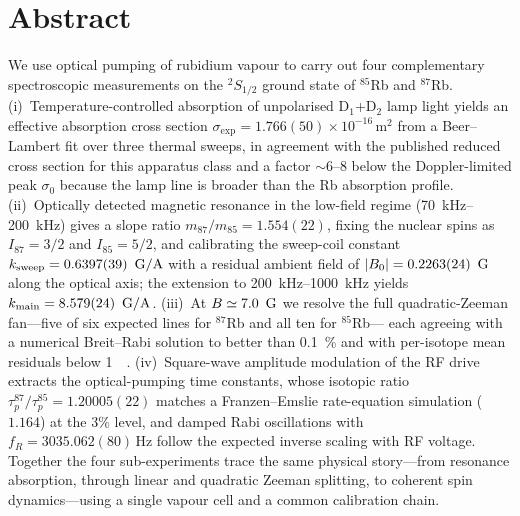 \section*{Abstract}
We use optical pumping of rubidium vapour to carry out four complementary
spectroscopic measurements on the $^2S_{1/2}$ ground state of
$^{85}$Rb and $^{87}$Rb.
(i)~Temperature-controlled absorption of unpolarised D$_1$+D$_2$ lamp
light yields an effective absorption cross section
$\sigma_{\mathrm{exp}} = 1.766(50)\times 10^{-16}\,\si{\meter\squared}$
from a Beer--Lambert fit over three thermal sweeps, in agreement with the
published reduced cross section for this apparatus class and a factor
${\sim}6\text{--}8$ below the Doppler-limited peak $\sigma_0$ because the
lamp line is broader than the Rb absorption profile.
(ii)~Optically detected magnetic resonance in the low-field regime
(\SIrange{70}{200}{\kilo\hertz}) gives a slope ratio
$m_{87}/m_{85} = 1.554(22)$, fixing the nuclear spins as
$I_{87} = 3/2$ and $I_{85} = 5/2$, and calibrating the sweep-coil
constant $k_{\mathrm{sweep}} = 0.6397(39)\,\si{\gauss\per\ampere}$
with a residual ambient field of
$|B_0| = 0.2263(24)\,\si{\gauss}$ along the optical axis;
the extension to \SIrange{200}{1000}{\kilo\hertz} yields
$k_{\mathrm{main}} = 8.579(24)\,\si{\gauss\per\ampere}$.
(iii)~At $B \simeq \SI{7.0}{\gauss}$ we resolve the full quadratic-Zeeman
fan---five of six expected lines for $^{87}$Rb and all ten for $^{85}$Rb---%
each agreeing with a numerical Breit--Rabi solution to better than
\SI{0.1}{\%} and with per-isotope mean residuals below \SI{1}{\milli\gauss}.
(iv)~Square-wave amplitude modulation of the RF drive extracts the
optical-pumping time constants, whose isotopic ratio
$\tau_p^{87}/\tau_p^{85} = 1.20005(22)$ matches a Franzen--Emslie
rate-equation simulation ($1.164$) at the $3\%$ level, and damped Rabi
oscillations with $f_R = 3035.062(80)\,\si{\hertz}$ follow the expected
inverse scaling with RF voltage. Together the four sub-experiments trace
the same physical story---from resonance absorption, through linear and
quadratic Zeeman splitting, to coherent spin dynamics---using a single
vapour cell and a common calibration chain.
